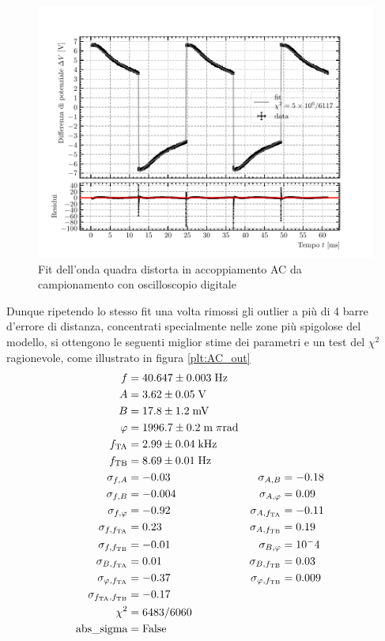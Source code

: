 \documentclass{article}[a4paper, oneside ,11pt]
\begin{document}
\begin{figure}[!htb]
	\centering 
 		\includegraphics[scale=0.9]{./DSOAC.pdf}
 	\caption{Fit dell'onda quadra distorta in accoppiamento AC da campionamento con oscilloscopio digitale\label{plt:DSOAC}}
\end{figure}
Dunque ripetendo lo stesso fit una volta rimossi gli outlier a più di 4 barre d'errore di distanza, concentrati specialmente nelle zone più spigolose del modello, si ottengono le seguenti miglior stime dei parametri e un test del $\chi^2$ ragionevole, come illustrato in figura \ref{plt:AC_out}
\begin{align*}
f &= 40.647 \pm 0.003 \; \rm Hz \\
A &= 3.62 \pm 0.05 \; \rm V \\
B &= 17.8 \pm 1.2 \; \rm mV \\
\varphi &= 1996.7 \pm 0.2 \; \mathrm{m}\; \pi \si{\radian} \\
f_{\rm TA} &= 2.99 \pm 0.04 \; \si{\kilo\hertz} \\
f_{\rm TB} &= 8.69 \pm 0.01 \; \rm Hz \\
\sigma_{f, A} &= -0.03 \qquad &\sigma_{A, B} &= -0.18 \\
\sigma_{f, B} &= -0.004 \qquad &\sigma_{A, \varphi} &= 0.09 \\
\sigma_{f, \varphi} &= -0.92 \qquad &\sigma_{A, f_{\rm TA}} &= -0.11 \\
\sigma_{f, f_{\rm TA}} &= 0.23 \qquad &\sigma_{A, f_{\rm TB}} &= 0.19 \\
\sigma_{f, f_{\rm TB}} &= -0.01 \qquad &\sigma_{B, \varphi} &= 10^-4 \\
\sigma_{B, f_{\rm TA}} &= 0.01 \qquad &\sigma_{B, f_{\rm TB}} &= 0.03 \\
\sigma_{\varphi, f_{\rm TA}} &= -0.37 \qquad &\sigma_{\varphi, f_{\rm TB}} &= 0.009 \\
\sigma_{f_{\rm TA}, f_{\rm TB}} &= -0.17 \\
\chi^2 &= 6483/6060 \\
\text{abs\_sigma} &= \rm False
\end{align*}
\end{document}
